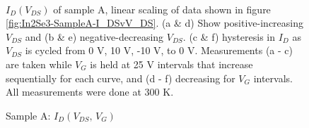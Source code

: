 \begin{figure}
\begin{centering}
{}
\par\end{centering}
\noindent \begin{centering}
~~~~
\par\end{centering}
\begin{centering}
\caption{Sample A: $I_{D}\left(V_{DS},\,V_{G}\right)$\label{fig:Sample-A-IDvsVDS}}
\par\end{centering}
$I_{D}\left(V_{DS}\right)$ of sample A, linear scaling of data shown
in figure \ref{fig:In2Se3-SampleA-I_DSvV_DS}. (a \& d) Show positive-increasing
$V_{DS}$ and (b \& e) negative-decreasing $V_{DS}$. (c \& f) hysteresis
in $I_{D}$ as $V_{DS}$ is cycled from 0 V, 10 V, -10 V, to 0 V.
Measurements (a - c) are taken while $V_{G}$ is held at 25 V intervals
that increase sequentially for each curve, and (d - f) decreasing
for $V_{G}$ intervals. All measurements were done at 300 K.
\end{figure}

